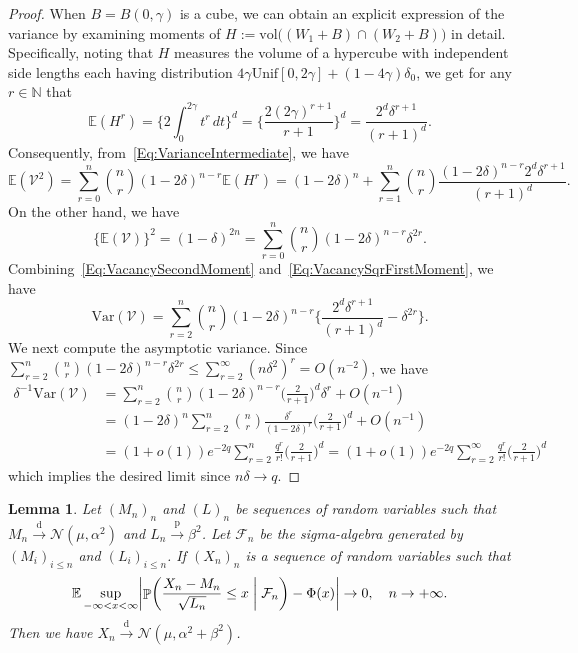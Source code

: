 \documentclass[11pt]{article}
\newtheorem{lemma}[thm]{Lemma}
\DeclareMathOperator{\Prob}{\mathbb{P}}
\newcommand{\E}{\mathbb{E}}
\newcommand{\vol}{\mathrm{vol}}
\newcommand{\var}{\mathrm{Var}}
\newcommand{\pto}{\xrightarrow{\,\mathrm{p}\,} }
\newcommand{\dto}{\xrightarrow{\,\mathrm{d}\,} }
\begin{document}
\begin{proof}
    When $B = B(0,\gamma)$ is a cube, we can obtain an explicit expression of the variance by examining moments of $H:=\vol\bigl((W_1+B)\cap (W_2+B)\bigr)$ in detail. Specifically, noting that $H$ measures the volume of a hypercube with independent side lengths each having distribution $4\gamma\mathrm{Unif}[0,2\gamma] + (1-4\gamma)\delta_0$, we get for any $r\in\mathbb{N}$ that 
    \[  
    \mathbb{E}(H^r) =  \biggl\{2\int_0^{2\gamma} t^r\,dt\biggr\}^d = \biggl\{\frac{2(2\gamma)^{r+1}}{r+1}\biggr\}^d = \frac{2^d \delta^{r+1}}{(r+1)^d}.
    \]
    Consequently, from~\eqref{Eq:VarianceIntermediate}, we have 
    \begin{equation}
    \mathbb{E}(\mathcal{V}^2) = \sum_{r=0}^n \binom{n}{r}(1-2\delta)^{n-r}\mathbb{E}(H^r) = (1-2\delta)^n + \sum_{r=1}^n\binom{n}{r}\frac{(1-2\delta)^{n-r}2^d \delta^{r+1}}{(r+1)^d}.\label{Eq:VacancySecondMoment}
    \end{equation}
    On the other hand, we have 
    \begin{equation}
    \label{Eq:VacancySqrFirstMoment}
    \{\mathbb{E}(\mathcal{V})\}^2 = (1-\delta)^{2n} = \sum_{r=0}^n\binom{n}{r}(1-2\delta)^{n-r}\delta^{2r}.
    \end{equation}
    Combining~\eqref{Eq:VacancySecondMoment} and~\eqref{Eq:VacancySqrFirstMoment}, we have 
    \[  
    \var(\mathcal{V}) = \sum_{r=2}^n \binom{n}{r}(1-2\delta)^{n-r}\biggl\{\frac{2^d\delta^{r+1}}{(r+1)^d} - \delta^{2r}\biggr\}.
    \]
We next compute the asymptotic variance. Since $\sum_{r=2}^n\binom{n}{r}(1-2\delta)^{n-r}\delta^{2r} \leq \sum_{r=2}^\infty (n\delta^2)^r = O(n^{-2})$, we have 
\begin{align*}
    \delta^{-1}\var(\mathcal{V}) &= \sum_{r=2}^n \binom{n}{r}(1-2\delta)^{n-r}\biggl(\frac{2}{r+1}\biggr)^d \delta^{r} + O(n^{-1})\\
    &=(1-2\delta)^n\sum_{r=2}^n\binom{n}{r} \frac{\delta^r}{(1-2\delta)^r}\biggl(\frac{2}{r+1}\biggr)^d + O(n^{-1})\\
    &=(1+o(1))e^{-2q} \sum_{r=2}^n \frac{q^r}{r!}\biggl(\frac{2}{r+1}\biggr)^d = (1+o(1))e^{-2q} \sum_{r=2}^\infty \frac{q^r}{r!}\biggl(\frac{2}{r+1}\biggr)^d
\end{align*}
which implies the desired limit since $n\delta\to q$.
\end{proof}

\begin{lemma}\label{lmm:ConditionalDistributionCLT}
Let $(M_n)_n$ and $(L)_n$ be sequences of random variables such that $M_n \dto \mathcal{N}(\mu, \alpha^2)$ and $L_n \pto \beta^2$. Let $\mathcal{F}_n$ be the sigma-algebra generated by $(M_i)_{i \leq n}$ and $(L_i)_{i \leq n}$. If $(X_n)_n$ is a sequence of random variables such that 
\begin{align}
    \E\sup_{-\infty < x < \infty} \biggl|\Prob\biggl(\frac{X_n - M_n}{\sqrt{L_n}} \leq x \biggm| \mathcal{F}_n\biggr) - \Phi(x)\biggr| \to 0, \quad n \to +\infty. \label{limit: ConditionalDistributionCLT} 
\end{align}
Then we have $X_n \dto \mathcal{N}(\mu, \alpha^2 + \beta^2)$.
\end{lemma}
\end{document}
